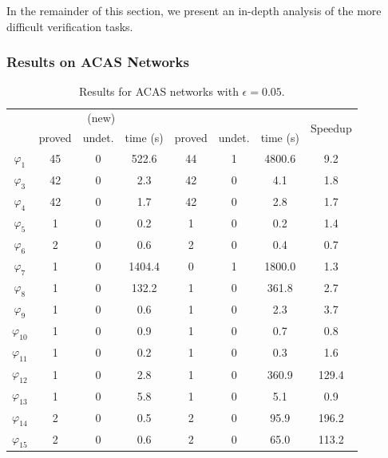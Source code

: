 In the remainder of this section, we present an in-depth analysis of
the more difficult verification tasks.



\subsubsection{Results on ACAS Networks}


\begin{table}
	\centering
\caption{Results for ACAS networks with $ \epsilon = 0.05 $.}
\label{neurodiff:tbl:acas_orig}
		\begin{tabular}{|c|ccc|ccc|c|}\hline
			\multirow{2}{*}{\makecell[c]{Property}} &  \multicolumn{3}{c|}{\Name{} (new)}
			& \multicolumn{3}{c|}{\ReluDiffP{}} & \multirow{2}{*}{Speedup} \\
			\cline{2-7}
			& proved  & undet. & time (s) & proved & undet. & time (s) &  \\\hline
			\hline

        $\varphi_{1}$   & 45    & 0     & 522.6         & 44    & 1     & 4800.6        &   9.2         \\\hline
$\varphi_{3}$   & 42    & 0     &   2.3         & 42    & 0     &   4.1         &   1.8         \\\hline
$\varphi_{4}$   & 42    & 0     &   1.7         & 42    & 0     &   2.8         &   1.7         \\\hline
$\varphi_{5}$   & 1     & 0     &   0.2         & 1     & 0     &   0.2         &   1.4         \\\hline
$\varphi_{6}$  & 2     & 0     &   0.6         & 2     & 0     &   0.4         &   0.7         \\\hline
$\varphi_{7}$   & 1     & 0     & 1404.4        & 0     & 1     & 1800.0        &   1.3         \\\hline
$\varphi_{8}$   & 1     & 0     & 132.2         & 1     & 0     & 361.8         &   2.7         \\\hline
$\varphi_{9}$   & 1     & 0     &   0.6         & 1     & 0     &   2.3         &   3.7         \\\hline
$\varphi_{10}$  & 1     & 0     &   0.9         & 1     & 0     &   0.7         &   0.8         \\\hline
$\varphi_{11}$  & 1     & 0     &   0.2         & 1     & 0     &   0.3         &   1.6         \\\hline
$\varphi_{12}$  & 1     & 0     &   2.8         & 1     & 0     & 360.9         & 129.4         \\\hline
$\varphi_{13}$  & 1     & 0     &   5.8         & 1     & 0     &   5.1         &   0.9         \\\hline
$\varphi_{14}$  & 2     & 0     &   0.5         & 2     & 0     &  95.9         & 196.2         \\\hline
$\varphi_{15}$  & 2     & 0     &   0.6         & 2     & 0     &  65.0         & 113.2         \\\hline

		\end{tabular}
\end{table}

